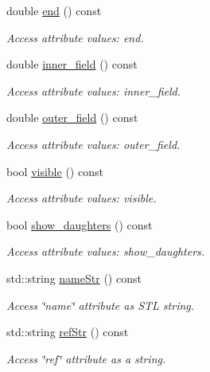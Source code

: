 \begin{DoxyCompactItemize}
double \hyperlink{struct_d_d4hep_1_1_x_m_l_1_1_child_value_a379e1cfe1346ba776f224280671f60ce}{end} () const
\begin{DoxyCompactList}\small\item\em Access attribute values\+: end. \end{DoxyCompactList}\item 
double \hyperlink{struct_d_d4hep_1_1_x_m_l_1_1_child_value_a62d60c9f68437075df585ee98bd459af}{inner\+\_\+field} () const
\begin{DoxyCompactList}\small\item\em Access attribute values\+: inner\+\_\+field. \end{DoxyCompactList}\item 
double \hyperlink{struct_d_d4hep_1_1_x_m_l_1_1_child_value_aecb871ff92872012aa20706dfcf1a9d3}{outer\+\_\+field} () const
\begin{DoxyCompactList}\small\item\em Access attribute values\+: outer\+\_\+field. \end{DoxyCompactList}\item 
bool \hyperlink{struct_d_d4hep_1_1_x_m_l_1_1_child_value_a388de69adb50fd55b33d695c0a8d73f8}{visible} () const
\begin{DoxyCompactList}\small\item\em Access attribute values\+: visible. \end{DoxyCompactList}\item 
bool \hyperlink{struct_d_d4hep_1_1_x_m_l_1_1_child_value_a4f0ed3b9ea2ee928df1fc69c1b50b27d}{show\+\_\+daughters} () const
\begin{DoxyCompactList}\small\item\em Access attribute values\+: show\+\_\+daughters. \end{DoxyCompactList}\item 
std\+::string \hyperlink{struct_d_d4hep_1_1_x_m_l_1_1_child_value_acf59342e9514f92c43b479650000e767}{name\+Str} () const
\begin{DoxyCompactList}\small\item\em Access \char`\"{}name\char`\"{} attribute as S\+TL string. \end{DoxyCompactList}\item 
std\+::string \hyperlink{struct_d_d4hep_1_1_x_m_l_1_1_child_value_aa14791667e4ee10e9fc8ca41933b4e9e}{ref\+Str} () const
\begin{DoxyCompactList}\small\item\em Access \char`\"{}ref\char`\"{} attribute as a string. \end{DoxyCompactList}\item 

\end{DoxyCompactItemize}
